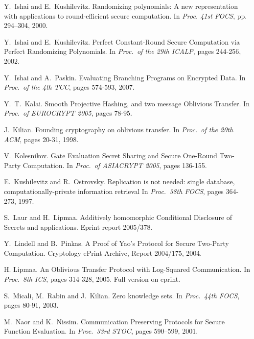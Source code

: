 \documentclass[11pt]{article}
\begin{document}
\begin{thebibliography}{10}
Y.~Ishai and E.~Kushilevitz.
\newblock Randomizing polynomials: A new representation with applications to
     round-efficient secure computation.
\newblock In {\em Proc. 41st FOCS}, pp. 294--304, 2000.

Y.~Ishai and E.~Kushilevitz.
\newblock Perfect Constant-Round Secure Computation via Perfect Randomizing Polynomials.
\newblock In {\em Proc.\ of the 29th ICALP}, pages 244-256, 2002.

Y.~Ishai and A.~Paskin.
\newblock Evaluating Branching Programs on Encrypted Data.
\newblock In {\em Proc.\ of the 4th TCC}, pages 574-593, 2007.


Y.~T.~Kalai.
\newblock Smooth Projective Hashing, and two message Oblivious Transfer.
\newblock In {\em Proc.\ of EUROCRYPT 2005}, pages 78-95.

J.~Kilian.
\newblock Founding cryptography on oblivious transfer.
\newblock In {\em Proc.\ of the 20th ACM}, pages 20-31, 1998.


V.~Kolesnikov.
\newblock  Gate Evaluation Secret Sharing and Secure
One-Round Two-Party Computation.
\newblock In {\em Proc.\ of ASIACRYPT 2005}, pages 136-155.


E.~Kushilevitz and R.~Ostrovsky.
\newblock Replication is not needed: single database, computationally-private
          information retrieval
\newblock In {\em Proc.\ 38th FOCS}, pages 364-273, 1997.

S.~Laur and H.~Lipmaa.
\newblock Additively homomorphic Conditional Disclosure of Secrets and applications.
\newblock Eprint report 2005/378.

Y.~Lindell and B.~Pinkas.
\newblock A Proof of Yao's Protocol for Secure Two-Party Computation.
\newblock Cryptology ePrint Archive, Report 2004/175, 2004.

H. Lipmaa.
\newblock An Oblivious Transfer Protocol with Log-Squared Communication.
\newblock In {\em Proc.\ 8th ICS}, pages 314-328, 2005. Full
version on eprint.

S.~Micali, M.~Rabin and J.~Kilian.
\newblock Zero knowledge sets.
\newblock In {\em Proc.\ 44th FOCS}, pages 80-91, 2003.

 M.~Naor and K.~Nissim.
\newblock Communication Preserving Protocols for Secure Function
Evaluation.
\newblock In {\em Proc.\ 33rd STOC}, pages 590--599, 2001.



\end{thebibliography}
\end{document}
